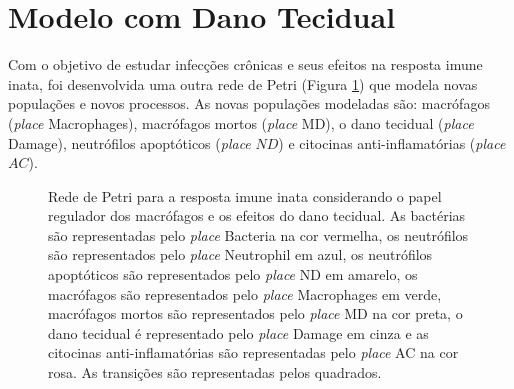 \documentclass[a4paper,10pt]{article}
\begin{document}
	\section[Modelo com Dano Tecidual]{Modelo com Dano Tecidual}
	
		Com o objetivo de estudar infecções crônicas e seus efeitos na resposta imune inata, foi desenvolvida uma 
		outra rede de Petri (Figura \ref{fig:redeDano}) que modela novas populações e novos processos. 
		As novas populações modeladas são: macrófagos (\textit{place} Macrophages), macrófagos mortos (\textit{place} MD), o dano tecidual (\textit{place} Damage), 
		neutrófilos apoptóticos (\textit{place} $ND$) e citocinas anti-inflamatórias (\textit{place} $AC$).
		
		
		\begin{figure}
			\begin{center}
				
			\end{center}
			\caption{Rede de Petri para a resposta imune inata considerando o papel regulador dos macrófagos e os efeitos do dano tecidual. 
			As bactérias são representadas pelo \textit{place} Bacteria na cor vermelha, os neutrófilos são representados pelo \textit{place} Neutrophil em azul, 
			os neutrófilos apoptóticos são representados pelo \textit{place} ND em amarelo, os macrófagos são representados pelo \textit{place} Macrophages 
			em verde, macrófagos mortos são representados pelo \textit{place} MD na cor preta, 
			o dano tecidual é representado pelo \textit{place} Damage em cinza e as citocinas anti-inflamatórias são representadas pelo \textit{place} 
			AC na cor rosa. As transições são representadas pelos quadrados. }
			\label{fig:redeDano}
		\end{figure}
		
\end{document}
